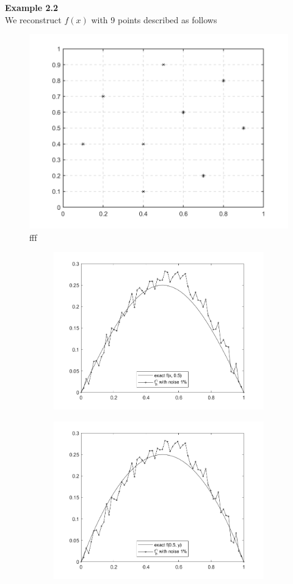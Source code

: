 \documentclass[]{article}
\begin{document}
\newpage
\noindent\textbf{Example 2.2}
\\
We reconstruct $f(x)$ with 9 points described as follows
\begin{figure}[h!]
	\centering
	\includegraphics[width=.5\linewidth]{../Csharp/Results/Nine_Points}
	\caption{fff}
\end{figure}
\begin{figure}[h!]
	\begin{subfigure}{.5\linewidth}
		\centering
		\includegraphics[width=\linewidth]{../Csharp/Results/HS_9Points_fx1}
	\end{subfigure}%
	\begin{subfigure}{.5\linewidth}
		\centering
		\includegraphics[width=\linewidth]{../Csharp/Results/HS_9Points_fx2}

\end{subfigure}
\end{figure}
\end{document}
